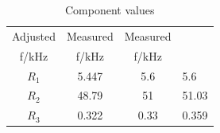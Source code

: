 \begin{table}[ht!]
\centering
\begin{tabular}{|c||c||c|}
	\hline
	Adjusted & Measured & Measured \\
    f/kHz &  f/kHz & f/kHz \\ \hline\hline
	$R_1$ & 5.447 & 5.6 & 5.6\\
	\hline
	  $R_2$ & 48.79 & 51 &51.03\\
	\hline
	$R_3$ & 0.322 & 0.33 &0.359\\
    \hline
\end{tabular}
\caption{Component values}
\label{components}
\end{table}
